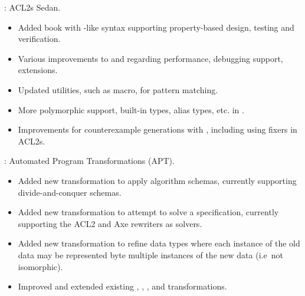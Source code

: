\begin{frame}

\implibtitle

: ACL2s Sedan.
\begin{itemize}
\item Added  book with -like syntax
  supporting property-based design, testing and verification.
\item Various improvements to  and 
  regarding performance, debugging support, extensions.
\item Updated utilities, such as  macro, for pattern matching.
\item More polymorphic support, built-in types, alias types, etc.
  in .
\item Improvements for counterexample generations with ,
  including using fixers in ACL2s.
\end{itemize}

\end{frame}


\begin{frame}

\implibtitle

:
Automated Program Transformations (APT).
\begin{itemize}
\item Added new  transformation to apply algorithm schemas,
      currently supporting divide-and-conquer schemas.
\item Added new  transformation to attempt to solve a specification,
      currently supporting the ACL2 and Axe rewriters as solvers.
\item Added new  transformation to refine data types
      where each instance of the old data may be represented byte
      multiple instances of the new data (i.e\ not isomorphic).
\item Improved and extended existing
      , , , and 
      transformations.
\end{itemize}

\end{frame}


